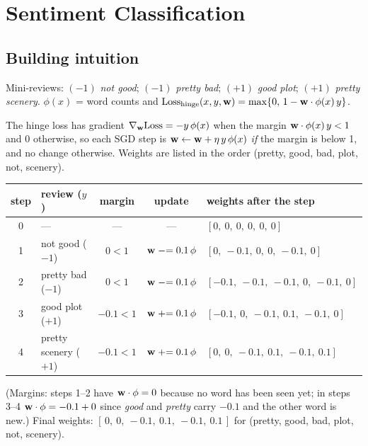 \section{Sentiment Classification}
\label{sec:sentiment}

\subsection{Building intuition}

Mini-reviews: $(-1)$ \emph{not good}; $(-1)$ \emph{pretty bad}; $(+1)$ \emph{good plot}; $(+1)$ \emph{pretty scenery}.
$\phi(x)$ = word counts and
$\text{Loss}_{\text{hinge}}(x,y,\mathbf{w})=\max\{0,\,1-\mathbf{w}\cdot\phi(x)\,y\}$.

\begin{solution}
The hinge loss has gradient $\nabla_{\mathbf{w}}\text{Loss}=-y\,\phi(x)$ when the margin
$\mathbf{w}\cdot\phi(x)\,y<1$ and $0$ otherwise, so each SGD step is
$\mathbf{w}\leftarrow\mathbf{w}+\eta\,y\,\phi(x)$ \emph{if} the margin is below 1, and no change otherwise.
Weights are listed in the order (pretty, good, bad, plot, not, scenery).
\begin{center}\small
\begin{tabular}{clccl}
\toprule
step & review ($y$) & margin & update & weights after the step \\
\midrule
0 & --- & --- & --- & $[0,\ 0,\ 0,\ 0,\ 0,\ 0]$ \\
1 & not good ($-1$) & $0<1$ & $\mathbf{w}\mathrel{-}=0.1\,\phi$ & $[0,\ -0.1,\ 0,\ 0,\ -0.1,\ 0]$ \\
2 & pretty bad ($-1$) & $0<1$ & $\mathbf{w}\mathrel{-}=0.1\,\phi$ & $[-0.1,\ -0.1,\ -0.1,\ 0,\ -0.1,\ 0]$ \\
3 & good plot ($+1$) & $-0.1<1$ & $\mathbf{w}\mathrel{+}=0.1\,\phi$ & $[-0.1,\ 0,\ -0.1,\ 0.1,\ -0.1,\ 0]$ \\
4 & pretty scenery ($+1$) & $-0.1<1$ & $\mathbf{w}\mathrel{+}=0.1\,\phi$ & $[0,\ 0,\ -0.1,\ 0.1,\ -0.1,\ 0.1]$ \\
\bottomrule
\end{tabular}
\end{center}
(Margins: steps 1--2 have $\mathbf{w}\cdot\phi=0$ because no word has been seen yet; in steps 3--4
$\mathbf{w}\cdot\phi=-0.1+0$ since \emph{good} and \emph{pretty} carry $-0.1$ and the other word is new.)
Final weights: $\boxed{[\,0,\ 0,\ -0.1,\ 0.1,\ -0.1,\ 0.1\,]}$ for (pretty, good, bad, plot, not, scenery).
\end{solution}

